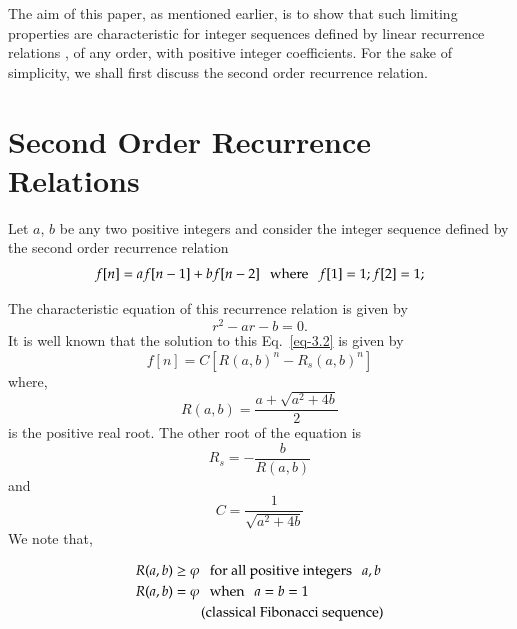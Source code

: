 \begin{multicols}{2}
The aim of this paper, as mentioned earlier, is to show that such limiting properties are characteristic for integer sequences defined by linear recurrence relations , of any order, with positive integer coefficients. For the sake of simplicity, we shall first discuss the second order recurrence relation. 
 
\vspace{-.2cm} 
 
\section{Second Order Recurrence\\ Relations}\label{section-3} 

\vspace{-.1cm} 

Let $a$, $b$ be any two positive integers and consider the integer sequence defined by the second order recurrence relation
\begin{equation}
f[n] = a f[n-1] + b f[n-2] \hspace{0.1in}  \textup{where} \hspace{0.1in}  f[1] = 1; f[2]= 1;\label{eq-3.1}
\end{equation}
 
The characteristic equation of this recurrence relation is given by
\begin{equation}
r^2 - ar - b = 0.\label{eq-3.2}
\end{equation}
It is well known that the solution to this Eq.~\eqref{eq-3.2} is given by
\begin{equation*}
f[n] =  C[R(a,b)^n - R_s(a,b)^n]
\end{equation*}
where, 
\begin{equation*}
R(a,b) = \displaystyle{\frac{a +\sqrt{a^2 + 4b}}{2}}
\end{equation*}
is the positive real root. The other root of the equation is 
\begin{equation*}
R_s = - \frac{b}{R(a,b)}
\end{equation*}
and 
\begin{equation*}
C = \displaystyle{\frac{1}{\sqrt{a^2 + 4b}}}
\end{equation*}
We note that,

\vspace{-.6cm}

\begin{align}
R(a,b) &\geq \varphi \hspace{0.1in} \textup{for all positive integers} \hspace{0.1in} a, b\\\label{eq-3.3}
R(a,b) &= \varphi   \hspace{0.1in}\textup{when}\hspace{0.1in} a = b = 1\\\label{eq-3.4}
       & \quad\quad \textup{(classical Fibonacci sequence)}\nonumber
\end{align}



\end{multicols}
